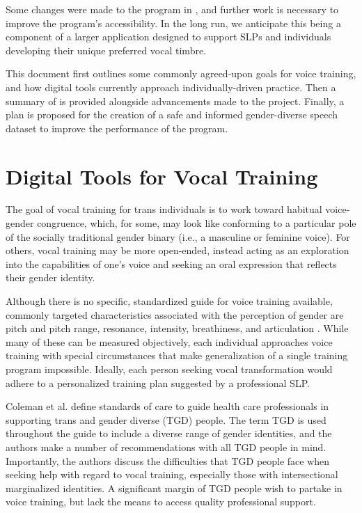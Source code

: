 \documentclass{article}
\begin{document}
Some changes were made to the program in \cite{doyle2025}, and further work is necessary to improve the program's accessibility. In the long run, we anticipate this being a component of a larger application designed to support SLPs and individuals developing their unique preferred vocal timbre.

This document first outlines some commonly agreed-upon goals for voice training, and how digital tools currently approach individually-driven practice. Then a summary of \cite{doyle2025} is provided alongside advancements made to the project. Finally, a plan is proposed for the creation of a safe and informed gender-diverse speech dataset to improve the performance of the program.

\section{Digital Tools for Vocal Training}

The goal of vocal training for trans individuals is to work toward habitual voice-gender congruence, which, for some, may look like conforming to a particular pole of the socially traditional gender binary (i.e., a masculine or feminine voice). For others, vocal training may be more open-ended, instead acting as an exploration into the capabilities of one's voice and seeking an oral expression that reflects their gender identity.

Although there is no specific, standardized guide for voice training available, commonly targeted characteristics associated with the perception of gender are pitch and pitch range, resonance, intensity, breathiness, and articulation \cite{coleman2022, leyns2021, oates2019, oates2023, davies2015}. While many of these can be measured objectively, each individual approaches voice training with special circumstances that make generalization of a single training program impossible. Ideally, each person seeking vocal transformation would adhere to a personalized training plan suggested by a professional SLP.

Coleman et al. \cite{coleman2022} define standards of care to guide health care professionals in supporting trans and gender diverse (TGD) people. The term TGD is used throughout the guide to include a diverse range of gender identities, and the authors make a number of recommendations with all TGD people in mind. Importantly, the authors discuss the difficulties that TGD people face when seeking help with regard to vocal training, especially those with intersectional marginalized identities. A significant margin of TGD people wish to partake in voice training, but lack the means to access quality professional support.
\end{document}
